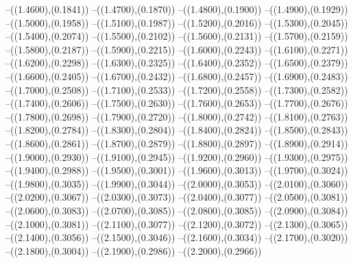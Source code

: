 {	--({\sx*(1.4600)},{\sy*(0.1841)})
	--({\sx*(1.4700)},{\sy*(0.1870)})
	--({\sx*(1.4800)},{\sy*(0.1900)})
	--({\sx*(1.4900)},{\sy*(0.1929)})
	--({\sx*(1.5000)},{\sy*(0.1958)})
	--({\sx*(1.5100)},{\sy*(0.1987)})
	--({\sx*(1.5200)},{\sy*(0.2016)})
	--({\sx*(1.5300)},{\sy*(0.2045)})
	--({\sx*(1.5400)},{\sy*(0.2074)})
	--({\sx*(1.5500)},{\sy*(0.2102)})
	--({\sx*(1.5600)},{\sy*(0.2131)})
	--({\sx*(1.5700)},{\sy*(0.2159)})
	--({\sx*(1.5800)},{\sy*(0.2187)})
	--({\sx*(1.5900)},{\sy*(0.2215)})
	--({\sx*(1.6000)},{\sy*(0.2243)})
	--({\sx*(1.6100)},{\sy*(0.2271)})
	--({\sx*(1.6200)},{\sy*(0.2298)})
	--({\sx*(1.6300)},{\sy*(0.2325)})
	--({\sx*(1.6400)},{\sy*(0.2352)})
	--({\sx*(1.6500)},{\sy*(0.2379)})
	--({\sx*(1.6600)},{\sy*(0.2405)})
	--({\sx*(1.6700)},{\sy*(0.2432)})
	--({\sx*(1.6800)},{\sy*(0.2457)})
	--({\sx*(1.6900)},{\sy*(0.2483)})
	--({\sx*(1.7000)},{\sy*(0.2508)})
	--({\sx*(1.7100)},{\sy*(0.2533)})
	--({\sx*(1.7200)},{\sy*(0.2558)})
	--({\sx*(1.7300)},{\sy*(0.2582)})
	--({\sx*(1.7400)},{\sy*(0.2606)})
	--({\sx*(1.7500)},{\sy*(0.2630)})
	--({\sx*(1.7600)},{\sy*(0.2653)})
	--({\sx*(1.7700)},{\sy*(0.2676)})
	--({\sx*(1.7800)},{\sy*(0.2698)})
	--({\sx*(1.7900)},{\sy*(0.2720)})
	--({\sx*(1.8000)},{\sy*(0.2742)})
	--({\sx*(1.8100)},{\sy*(0.2763)})
	--({\sx*(1.8200)},{\sy*(0.2784)})
	--({\sx*(1.8300)},{\sy*(0.2804)})
	--({\sx*(1.8400)},{\sy*(0.2824)})
	--({\sx*(1.8500)},{\sy*(0.2843)})
	--({\sx*(1.8600)},{\sy*(0.2861)})
	--({\sx*(1.8700)},{\sy*(0.2879)})
	--({\sx*(1.8800)},{\sy*(0.2897)})
	--({\sx*(1.8900)},{\sy*(0.2914)})
	--({\sx*(1.9000)},{\sy*(0.2930)})
	--({\sx*(1.9100)},{\sy*(0.2945)})
	--({\sx*(1.9200)},{\sy*(0.2960)})
	--({\sx*(1.9300)},{\sy*(0.2975)})
	--({\sx*(1.9400)},{\sy*(0.2988)})
	--({\sx*(1.9500)},{\sy*(0.3001)})
	--({\sx*(1.9600)},{\sy*(0.3013)})
	--({\sx*(1.9700)},{\sy*(0.3024)})
	--({\sx*(1.9800)},{\sy*(0.3035)})
	--({\sx*(1.9900)},{\sy*(0.3044)})
	--({\sx*(2.0000)},{\sy*(0.3053)})
	--({\sx*(2.0100)},{\sy*(0.3060)})
	--({\sx*(2.0200)},{\sy*(0.3067)})
	--({\sx*(2.0300)},{\sy*(0.3073)})
	--({\sx*(2.0400)},{\sy*(0.3077)})
	--({\sx*(2.0500)},{\sy*(0.3081)})
	--({\sx*(2.0600)},{\sy*(0.3083)})
	--({\sx*(2.0700)},{\sy*(0.3085)})
	--({\sx*(2.0800)},{\sy*(0.3085)})
	--({\sx*(2.0900)},{\sy*(0.3084)})
	--({\sx*(2.1000)},{\sy*(0.3081)})
	--({\sx*(2.1100)},{\sy*(0.3077)})
	--({\sx*(2.1200)},{\sy*(0.3072)})
	--({\sx*(2.1300)},{\sy*(0.3065)})
	--({\sx*(2.1400)},{\sy*(0.3056)})
	--({\sx*(2.1500)},{\sy*(0.3046)})
	--({\sx*(2.1600)},{\sy*(0.3034)})
	--({\sx*(2.1700)},{\sy*(0.3020)})
	--({\sx*(2.1800)},{\sy*(0.3004)})
	--({\sx*(2.1900)},{\sy*(0.2986)})
	--({\sx*(2.2000)},{\sy*(0.2966)})
}

